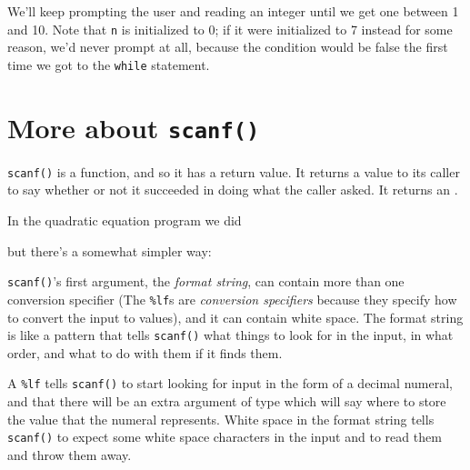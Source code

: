 \noindent We'll keep prompting the user and reading an integer until we
get one between 1 and 10.  Note that {\tt n} is initialized to 0; if it
were initialized to 7 instead for some reason, we'd never prompt at
all, because the condition would be false the first time we got to the
{\tt while} statement.


\section{More about {\tt scanf()}}

{\tt scanf()} is a function, and so it has a return value.  It returns a
value to its caller to say whether or not it succeeded in doing what the
caller asked.  It returns an \int.

In the quadratic equation program we did

\begin{flushleft}
\verb%   /*%\mbox{ get inputs $a$, $b$, and $c$ from user. }\verb%*/%
\\* \verb%   printf("Please input a, b, and c, one per line.\n");%
\\* \verb%   scanf("%\verb-%-\verb%lf", &a);%
\\* \verb%   scanf("%\verb-%-\verb%lf", &b);%
\\* \verb%   scanf("%\verb-%-\verb%lf", &c);%
\end{flushleft}

\noindent but there's a somewhat simpler way:


{\tt scanf()}'s first argument, the {\em format string}\/, can contain
more than one conversion specifier (The {\tt \%lf}s are {\em conversion
specifiers}\/ because they specify how to convert the input to values),
and it can contain white space.  The format string is like a pattern
that tells {\tt scanf()} what things to look for in the input, in what
order, and what to do with them if it finds them.

A {\tt \%lf} tells {\tt scanf()} to start looking for input in the form
of a decimal numeral, and that there will be an extra argument of type
\mbox{\Double} which will say where to store the value that the numeral
represents.  White space in the format string tells {\tt scanf()} to
expect some white space characters in the input and to read them and
throw them away.

